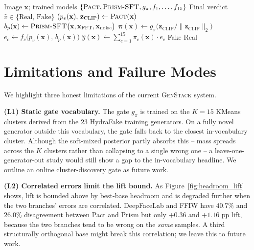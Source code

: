 \documentclass[10pt,twocolumn,letterpaper]{article}
\newcommand{\vfive}{\textsc{Pact}}
\newcommand{\prism}{\textsc{Prism-SFT}}
\begin{document}
\begin{algorithm}[h]
\footnotesize
\caption{\textsc{GenStack-15} inference (single image)}
\label{alg:inference}
\begin{algorithmic}[1]
\Require Image $\mathbf{x}$; trained models $\{\vfive, \prism, g_\pi, f_1,\dots,f_{15}\}$
\Ensure Final verdict $\hat{v}\in\{\text{Real, Fake}\}$
\State $(p_v(\mathbf{x}),\, \mathbf{z}_{\text{CLIP}}) \gets \vfive(\mathbf{x})$ 
\State $b_p(\mathbf{x}) \gets \prism\bigl(\mathbf{x}, \mathbf{x}_{\text{FFT}}, \mathbf{x}_{\text{noise}}\bigr)$ 
\State $\boldsymbol{\pi}(\mathbf{x}) \gets g_\pi\bigl(\mathbf{z}_{\text{CLIP}}/\|\mathbf{z}_{\text{CLIP}}\|_2\bigr)$ 
    \State $e_c \gets f_c\!\bigl(p_v(\mathbf{x}),\, b_p(\mathbf{x})\bigr)$ 
\EndFor
\State $\hat{y}(\mathbf{x}) \gets \sum_{c=1}^{15} \pi_c(\mathbf{x}) \cdot e_c$ 
    \State \Return Fake
\Else
    \State \Return Real
\EndIf
\end{algorithmic}
\end{algorithm}

\section{Limitations and Failure Modes}
\label{sec:limitations}

We highlight three honest limitations of the current \textsc{GenStack} system.

\noindent\textbf{(L1) Static gate vocabulary.} The gate $g_\pi$ is trained on the $K{=}15$ KMeans clusters derived from the $23$ HydraFake training generators. On a fully novel generator outside this vocabulary, the gate falls back to the closest in-vocabulary cluster. Although the soft-mixed posterior partly absorbs this -- mass spreads across the $K$ clusters rather than collapsing to a single wrong one -- a leave-one-generator-out study would still show a gap to the in-vocabulary headline. We outline an online cluster-discovery gate as future work.

\noindent\textbf{(L2) Correlated errors limit the lift bound.} As Figure~\ref{fig:headroom_lift} shows, lift is bounded above by best-base headroom and is degraded further when the two branches' errors are correlated. DeepFaceLab and FFIW have $40.7\%$ and $26.0\%$ disagreement between Pact and Prism but only $+0.36$ and $+1.16$ pp lift, because the two branches tend to be wrong on the \emph{same} samples. A third structurally orthogonal base might break this correlation; we leave this to future work.
\end{document}
